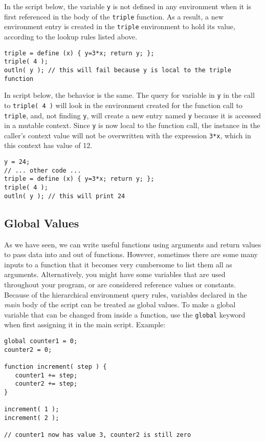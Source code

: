 \documentclass{article}
\begin{document}
In the script below, the variable \texttt{y} is not defined in any environment when it is first referenced in the body of the \texttt{triple} function.  As a result, a new environment entry is created in the \texttt{triple} environment to hold its value, according to the lookup rules listed above.

\begin{verbatim}
triple = define (x) { y=3*x; return y; };
triple( 4 );
outln( y ); // this will fail because y is local to the triple function
\end{verbatim}

In script below, the behavior is the same.  The query for variable in \texttt{y} in the call to \texttt{triple( 4 )} will look in the environment created for the function call to \texttt{triple}, and, not finding \texttt{y}, will create a new entry named \texttt{y} because it is accessed in a mutable context.  Since \texttt{y} is now local to the function call, the instance in the caller's context value will not be overwritten with the expression \texttt{3*x}, which in this context has value of 12.

\begin{verbatim}
y = 24;
// ... other code ...
triple = define (x) { y=3*x; return y; };
triple( 4 );
outln( y ); // this will print 24
\end{verbatim}


\subsection{Global Values}
As we have seen, we can write useful functions using arguments and return values to pass data into and out of functions.  However, sometimes there are some many inputs to a function that it becomes very cumbersome to list them all as arguments.  Alternatively, you might have some variables that are used throughout your program, or are considered reference values or constants.  Because of the hierarchical environment query rules, variables declared in the \emph{main} body of the script can be treated as global values.  To make a global variable that can be changed from inside a function, use the \texttt{global} keyword when first assigning it in the main script. Example:

\begin{verbatim}
global counter1 = 0;
counter2 = 0;

function increment( step ) {
   counter1 += step;
   counter2 += step;	
}

increment( 1 );
increment( 2 );

// counter1 now has value 3, counter2 is still zero
\end{verbatim}
\end{document}
